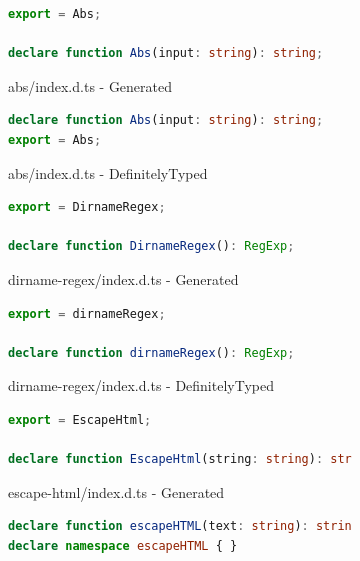 \documentclass[a4paper,english,cleveref, autoref]{lipics-v2019}
\begin{document}
\begin{figure}[tp]
    \centering
    \begin{subfigure}{0.48\linewidth}
      \begin{lstlisting}[language=TypeScript]
export = Abs;

declare function Abs(input: string): string;
      \end{lstlisting}
      \caption{abs/index.d.ts - Generated}
    \end{subfigure}
    \hfill
    \begin{subfigure}{0.48\linewidth}
      \begin{lstlisting}[language=TypeScript]
declare function Abs(input: string): string;
export = Abs;
      \end{lstlisting}
      \caption{abs/index.d.ts - DefinitelyTyped}
    \end{subfigure}


    \begin{subfigure}{0.48\linewidth}
        \begin{lstlisting}[language=TypeScript]
export = DirnameRegex;

declare function DirnameRegex(): RegExp;
        \end{lstlisting}
        \caption{dirname-regex/index.d.ts - Generated}
      \end{subfigure}
      \hfill
      \begin{subfigure}{0.48\linewidth}
        \begin{lstlisting}[language=TypeScript]
export = dirnameRegex;

declare function dirnameRegex(): RegExp;
        \end{lstlisting}
        \caption{dirname-regex/index.d.ts - DefinitelyTyped}
      \end{subfigure}


      \begin{subfigure}{0.48\linewidth}
        \begin{lstlisting}[language=TypeScript]
export = EscapeHtml;

declare function EscapeHtml(string: string): string;
        \end{lstlisting}
        \caption{escape-html/index.d.ts - Generated}
      \end{subfigure}
      \hfill
      \begin{subfigure}{0.48\linewidth}
        \begin{lstlisting}[language=TypeScript]
declare function escapeHTML(text: string): string;
declare namespace escapeHTML { }


\end{lstlisting}
\end{subfigure}
\end{figure}
\end{document}
